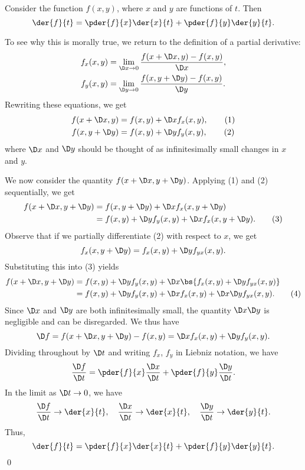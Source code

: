 \begin{proposition}
    Consider the function $f(x, y)$, where $x$ and $y$ are functions of $t$. Then \[\der{f}{t} = \pder{f}{x} \der{x}{t} + \pder{f}{y} \der{y}{t}.\]
\end{proposition}

To see why this is morally true, we return to the definition of a partial derivative:
\begin{align*}
    f_x(x, y) &= \lim_{\D x \to 0} \frac{f(x + \D x, y) - f(x, y)}{\D x},\\
    f_y(x, y) &= \lim_{\D y \to 0} \frac{f(x, y + \D y) - f(x, y)}{\D y}.
\end{align*}
Rewriting these equations, we get
\begin{align*}
    f(x + \D x, y) &= f(x, y) + \D x f_x(x, y), \tag{1}\\
    f(x, y + \D y) &= f(x, y) + \D y f_y(x, y), \tag{2}
\end{align*}
where $\D x$ and $\D y$ should be thought of as infinitesimally small changes in $x$ and $y$.

We now consider the quantity $f(x + \D x, y + \D y)$. Applying (1) and (2) sequentially, we get
\begin{align*}
    f(x + \D x, y + \D y) &= f(x, y + \D y) + \D x f_x(x, y + \D y)\\
    &= f(x, y) + \D y f_y(x,y) + \D x f_x(x, y + \D y). \tag{3}
\end{align*}
Observe that if we partially differentiate (2) with respect to $x$, we get \[f_x(x, y + \D y) = f_x(x, y) + \D y f_{yx}(x, y).\] Substituting this into (3) yields
\begin{align*}
    f(x + \D x, y + \D y) &= f(x, y) + \D y f_y(x,y) + \D x \bs{f_x(x, y) + \D y f_{yx}(x, y)}\\
    &= f(x, y) + \D y f_y(x,y) + \D x f_x(x, y) + \D x\D y f_{yx}(x, y). \tag{4}
\end{align*}
Since $\D x$ and $\D y$ are both infinitesimally small, the quantity $\D x \D y$ is negligible and can be disregarded. We thus have \[\D f = f(x + \D x, y + \D y) - f(x, y) = \D x f_x(x, y) + \D y f_y(x,y).\] Dividing throughout by $\D t$ and writing $f_x$, $f_y$ in Liebniz notation, we have \[\frac{\D f}{\D t} = \pder{f}{x} \frac{\D x}{\D t} + \pder{f}{y} \frac{\D y}{\D t}.\] In the limit as $\D t \to 0$, we have \[\frac{\D f}{\D t} \to \der{x}{t}, \quad \frac{\D x}{\D t} \to \der{x}{t}, \quad \frac{\D y}{\D t} \to \der{y}{t}.\] Thus, \[\der{f}{t} = \pder{f}{x} \der{x}{t} + \pder{f}{y} \der{y}{t}.\] \qed

